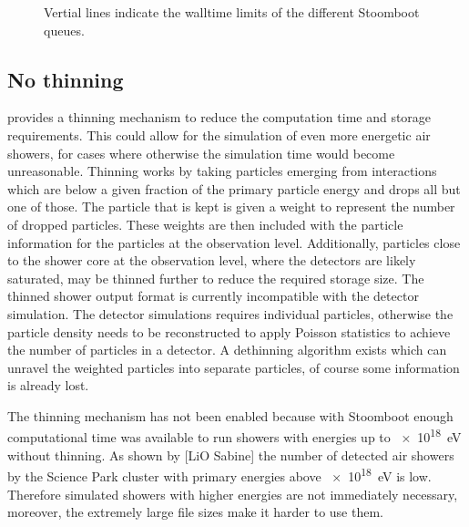 \begin{figure}
    \centering
    
    \caption{ Vertial lines indicate the walltime limits of the different Stoomboot queues.}
    \label{fig:simulations_shower_walltime}
\end{figure}


\subsection{No thinning}

\corsika provides a thinning mechanism to reduce the computation time and storage requirements. This could allow for the simulation of even more energetic air showers, for cases where otherwise the simulation time would become unreasonable. Thinning works by taking particles emerging from interactions which are below a given fraction of the primary particle energy and drops all but one of those. The particle that is kept is given a weight to represent the number of dropped particles. These weights are then included with the particle information for the particles at the observation level. Additionally, particles close to the shower core at the observation level, where the detectors are likely saturated, may be thinned further to reduce the required storage size. The thinned shower output format is currently incompatible with the \hisparc detector simulation. The detector simulations requires individual particles, otherwise the particle density needs to be reconstructed to apply Poisson statistics to achieve the number of particles in a detector. A dethinning algorithm exists \cite{stokes2012} which can unravel the weighted particles into separate particles, of course some information is already lost.

The thinning mechanism has not been enabled because with Stoomboot enough computational time was available to run showers with energies up to \SI{e18}{\eV} without thinning. As shown by [LiO Sabine] the number of detected air showers by the Science Park cluster with primary energies above \SI{e18}{\eV} is low. Therefore simulated showers with higher energies are not immediately necessary, moreover, the extremely large file sizes make it harder to use them.


